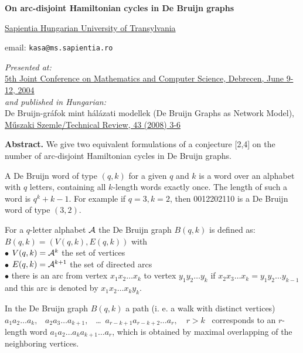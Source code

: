 \documentclass[10pt]{article}
\begin{document}
 
\begin{center}

\textbf{\LARGE On arc-disjoint Hamiltonian cycles in De Bruijn graphs}


\href{http://www.emte.ro}{Sapientia Hungarian University of Transylvania}

email: \texttt{kasa@ms.sapientia.ro}

\bigskip \emph{Presented at:} \\
\href{http://riesz.math.klte.hu/~macs/abstracts.pdf}{5th Joint Conference on Mathematics and Computer Science, Debrecen, June 9-12, 2004} \\
 \emph{and  published in Hungarian:}\\ De Bruijn-gr\'afok mint h\'al\'azati modellek (De Bruijn Graphs as Network Model), \href{http://www.emt.ro/downloads/muszaki_szemle/msz43.pdf}{M\H{u}szaki Szemle/Technical Review, 43 (2008) 3-6} 
\end{center}

\bigskip
{\small
\noindent\textbf{Abstract.} We give two equivalent formulations of a conjecture [2,4] on the number of arc-disjoint Hamiltonian cycles in De Bruijn graphs. 
}

\bigskip\noindent
A De Bruijn word  of type $(q,k)$ for a given $q$ and $k$ is a word over an alphabet with $q$ letters, containing all  $k$-length words exactly once. The length of such a word is $q^k+k-1$. 
For example if $q=3, k=2$, then  0012202110 is a De Bruijn word of type $(3,2)$.

\medskip\noindent
For a $q$-letter alphabet ${\cal A}$ the De Bruijn graph $B(q,k)$ is defined as:\\
${B(q,k)= (V(q,k), E(q,k))}$
with \\
$\bullet$ {$V(q,k)={\cal A}^k$}   \quad the set of vertices
\\
$\bullet$ {$E(q,k)= {\cal A}^{k+1}$}  the set of directed arcs
\\
$\bullet$ there is an arc from vertex {$x_1x_2\ldots x_k$} to  vertex {$y_1y_2\ldots y_k$}  if 
{$x_2x_3\ldots x_k=y_1y_2\ldots y_{k-1}$} 
and this arc is denoted by {$x_1x_2\ldots x_ky_k$}. 
      
\medskip\noindent
In the De Bruijn graph $B(q,k)$ a path (i. e. a walk with distinct vertices)
 $ {a_1a_2\ldots a_k,}$ \  $  {a_2a_3\ldots a_{k+1},}$ \  
\ldots \ ${ a_{r-k+1}a_{r-k+2}\ldots a_r , \quad r>k}$ \   
corresponds to an $r$-length word 
 {$a_1a_2\ldots a_ka_{k+1}\ldots a_r$},
 which 
is obtained by maximal overlapping of the neighboring vertices. 
\end{document}
